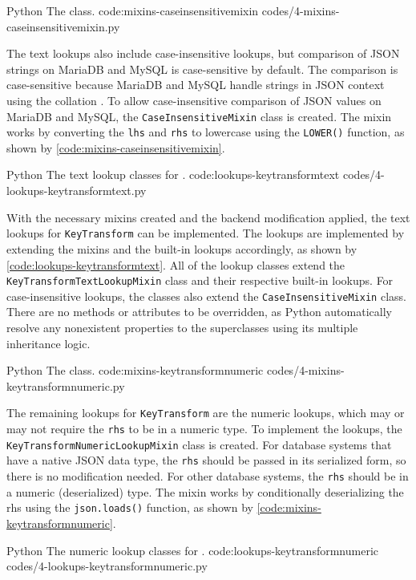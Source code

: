 \listing
{Python}
{The  class.}
{code:mixins-caseinsensitivemixin}
{codes/4-mixins-caseinsensitivemixin.py}

The text lookups also include case-insensitive lookups, but comparison of JSON
strings on MariaDB and MySQL is case-sensitive by default. The comparison is
case-sensitive because MariaDB and MySQL handle strings in JSON context using
the  collation \cite{mysql:json}. To allow case-insensitive
comparison of JSON values on MariaDB and MySQL, the \verb|CaseInsensitiveMixin|
class is created. The mixin works by converting the \verb|lhs| and \verb|rhs|
to lowercase using the \verb|LOWER()| function, as shown by
\autoref{code:mixins-caseinsensitivemixin}.

\listing
{Python}
{The text lookup classes for .}
{code:lookups-keytransformtext}
{codes/4-lookups-keytransformtext.py}

With the necessary mixins created and the backend modification applied, the
text lookups for \verb|KeyTransform| can be implemented. The lookups are
implemented by extending the mixins and the built-in lookups accordingly, as
shown by \autoref{code:lookups-keytransformtext}. All of the lookup classes
extend the \verb|KeyTransformTextLookupMixin| class and their respective
built-in lookups. For case-insensitive lookups, the classes also extend the
\verb|CaseInsensitiveMixin| class. There are no methods or attributes to be
overridden, as Python automatically resolve any nonexistent properties to the
superclasses using its multiple inheritance logic.

\listing
{Python}
{The  class.}
{code:mixins-keytransformnumeric}
{codes/4-mixins-keytransformnumeric.py}

The remaining lookups for \verb|KeyTransform| are the numeric lookups, which
may or may not require the \verb|rhs| to be in a numeric type. To implement
the lookups, the \verb|KeyTransformNumericLookupMixin| class is created. For
database systems that have a native JSON data type, the \verb|rhs| should be
passed in its serialized form, so there is no modification needed. For other
database systems, the \verb|rhs| should be in a numeric (deserialized) type.
The mixin works by conditionally deserializing the rhs using the
\verb|json.loads()| function, as shown by
\autoref{code:mixins-keytransformnumeric}.

\listing
{Python}
{The numeric lookup classes for .}
{code:lookups-keytransformnumeric}
{codes/4-lookups-keytransformnumeric.py}


